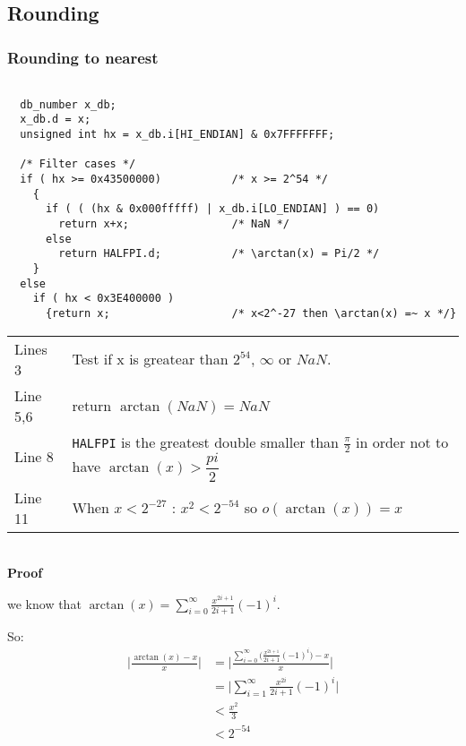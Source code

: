 \subsection{Rounding}
\subsubsection{Rounding to nearest}
\begin{lstlisting}[caption={Exceptional cases : rounding to nearest},firstnumber=1]

  db_number x_db;
  x_db.d = x;
  unsigned int hx = x_db.i[HI_ENDIAN] & 0x7FFFFFFF; 

  /* Filter cases */
  if ( hx >= 0x43500000)           /* x >= 2^54 */
    {
      if ( ( (hx & 0x000fffff) | x_db.i[LO_ENDIAN] ) == 0)
        return x+x;                /* NaN */
      else
        return HALFPI.d;           /* \arctan(x) = Pi/2 */
    }
  else
    if ( hx < 0x3E400000 )
      {return x;                   /* x<2^-27 then \arctan(x) =~ x */}

\end{lstlisting}
\begin{tabular}{ll}
Lines 3 & Test if x is greatear than $2^{54}$, $\infty$ or $NaN$. \\
Line 5,6 & return $\arctan(NaN) = NaN$\\
Line 8 & \texttt{HALFPI} is the greatest double smaller than
$\frac{\pi}{2}$ in order not to have $\arctan(x) > \dfrac{pi}{2}$ \\
Line 11 & When $x<2^{-27}$ : $x^2 < 2^{-54}$ so $o(\arctan(x)) = x$
\end{tabular}
\\

\textbf{Proof}

 we know that $\arctan(x) = \displaystyle {\sum_{i=0}^{\infty}
\frac{x^{2i+1}}{2i+1}(-1)^i}$.

So:
\begin{equation}
   \begin{split}
       \Big| \frac{\arctan(x)-x}{x}  \Big| & = 
       \Bigg|\frac{ \displaystyle {\sum_{i=0}^{\infty}
       \Big( \frac{x^{2i+1}}{2i+1}(-1)^i} \Big) - x}{x} \Bigg|
       \nonumber\\
       & = \Big|\displaystyle {\sum_{i=1}^{\infty}}
       \frac{x^{2i}}{2i+1}(-1)^i\Big|\nonumber \\ 
       & < \frac{x^2}{3}\nonumber \\
       & < 2^{-54} \nonumber
   \end{split}
\end{equation}

